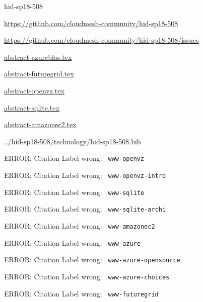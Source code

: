 \begin{IU}

hid-sp18-508

\url{https://github.com/cloudmesh-community/hid-sp18-508}

\url{https://github.com/cloudmesh-community/hid-sp18-508/issues}

\href{https://github.com/cloudmesh-community/hid-sp18-508/blob/master//technology/abstract-azureblas.tex}{abstract-azureblas.tex}

\href{https://github.com/cloudmesh-community/hid-sp18-508/blob/master//technology/abstract-futuregrid.tex}{abstract-futuregrid.tex}

\href{https://github.com/cloudmesh-community/hid-sp18-508/blob/master//technology/abstract-openvz.tex}{abstract-openvz.tex}

\href{https://github.com/cloudmesh-community/hid-sp18-508/blob/master//technology/abstract-sqlite.tex}{abstract-sqlite.tex}

\href{https://github.com/cloudmesh-community/hid-sp18-508/blob/master//technology/abstract-amazonec2.tex}{abstract-amazonec2.tex}

\href{https://github.com/cloudmesh-community/hid-sp18-508/blob/master//technology/hid-sp18-508.bib}{../hid-sp18-508/technology/hid-sp18-508.bib}

 ERROR: Citation Label wrong: \verb| www-openvz |

 ERROR: Citation Label wrong: \verb| www-openvz-intro |

 ERROR: Citation Label wrong: \verb| www-sqlite |

 ERROR: Citation Label wrong: \verb| www-sqlite-archi |

 ERROR: Citation Label wrong: \verb| www-amazonec2 |

 ERROR: Citation Label wrong: \verb| www-azure |

 ERROR: Citation Label wrong: \verb| www-azure-opensource |

 ERROR: Citation Label wrong: \verb| www-azure-choices |

 ERROR: Citation Label wrong: \verb| www-futuregrid |

\end{IU}


